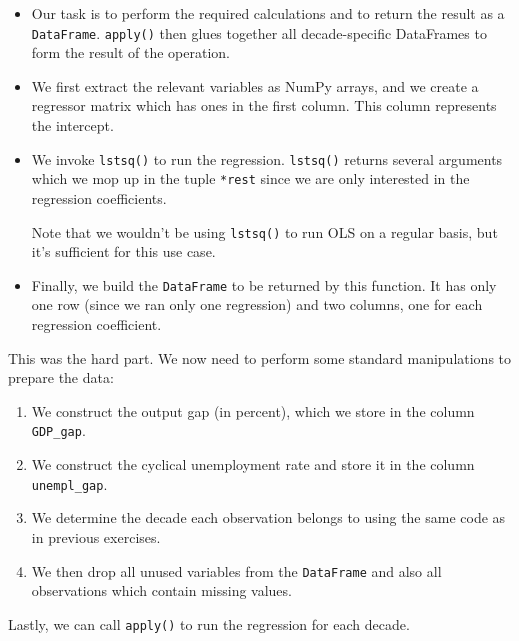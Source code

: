 \documentclass{scrartcl}
\providecommand{\tightlist}{%
      \setlength{\itemsep}{0pt}\setlength{\parskip}{0pt}}
\begin{document}
\begin{itemize}
\item
  Our task is to perform the required calculations and to return the
  result as a \texttt{DataFrame}. \texttt{apply()} then glues together
  all decade-specific DataFrames to form the result of the operation.
\item
  We first extract the relevant variables as NumPy arrays, and we create
  a regressor matrix which has ones in the first column. This column
  represents the intercept.
\item
  We invoke \texttt{lstsq()} to run the regression. \texttt{lstsq()}
  returns several arguments which we mop up in the tuple \texttt{*rest}
  since we are only interested in the regression coefficients.

  Note that we wouldn't be using \texttt{lstsq()} to run OLS on a
  regular basis, but it's sufficient for this use case.
\item
  Finally, we build the \texttt{DataFrame} to be returned by this
  function. It has only one row (since we ran only one regression) and
  two columns, one for each regression coefficient.
\end{itemize}

This was the hard part. We now need to perform some standard
manipulations to prepare the data:

\begin{enumerate}
\def\labelenumi{\arabic{enumi}.}
\tightlist
\item
  We construct the output gap (in percent), which we store in the column
  \texttt{GDP\_gap}.
\item
  We construct the cyclical unemployment rate and store it in the column
  \texttt{unempl\_gap}.
\item
  We determine the decade each observation belongs to using the same
  code as in previous exercises.
\item
  We then drop all unused variables from the \texttt{DataFrame} and also
  all observations which contain missing values.
\end{enumerate}

Lastly, we can call \texttt{apply()} to run the regression for each
decade.
\end{document}
